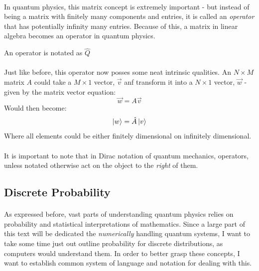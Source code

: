 \documentclass[12pt,letterpaper]{book}
\begin{document}
\paragraph*{}In quantum physics, this matrix concept is extremely important - but instead of being a matrix with finitely many components and entries, it is called an \textit{operator} that has potentially infinity many entries. Because of this, a matrix in linear algebra becomes an operator in quantum physics.
\begin{center}
An operator is notated as $\hat{Q}$
\end{center}
\paragraph*{}Just like before, this operator now posses some neat intrinsic qualities. An $N \times M$ matrix $A$ could take a $M \times 1$ vector, $\vec{v}$ anf transform it into a $N \times 1$ vector, $\vec{w}$ - given by the matrix vector equation:
\begin{equation}
\label{mat-vec}
\vec{w} =  A\vec{v}
\end{equation}
Would then become:
\begin{equation}
\label{op-ket}
\ket{w} = \hat{A}\ket{v}
\end{equation}
Where all elements could be either finitely dimensional on infinitely dimensional.
\paragraph*{}It is important to note that in Dirac notation of quantum mechanics, operators, unless notated otherwise act on the object to the \textit{right} of them.


\subsection*{Discrete Probability}
\paragraph*{}As expressed before, vast parts of understanding quantum physics relies on probability and statistical interpretations of mathematics. Since a large part of this text will be dedicated the \textit{numerically} handling quantum systems, I want to take some time just out outline probability for discrete distributions, as computers would understand them. In order to better grasp these concepts, I want to establish common system of language and notation for dealing with this.
\end{document}
